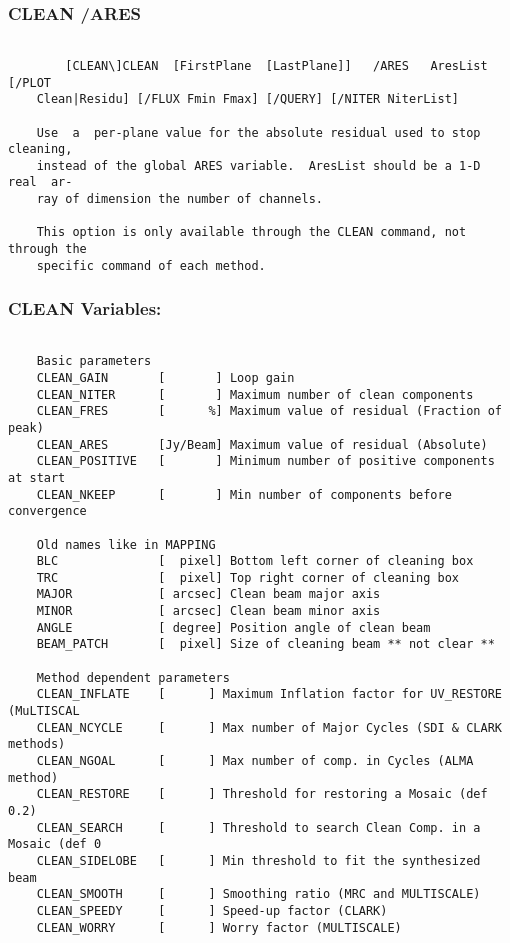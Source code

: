 \subsubsection{CLEAN /ARES}
\begin{verbatim}

        [CLEAN\]CLEAN  [FirstPlane  [LastPlane]]   /ARES   AresList   [/PLOT
    Clean|Residu] [/FLUX Fmin Fmax] [/QUERY] [/NITER NiterList]

    Use  a  per-plane value for the absolute residual used to stop cleaning,
    instead of the global ARES variable.  AresList should be a 1-D real  ar-
    ray of dimension the number of channels.

    This option is only available through the CLEAN command, not through the
    specific command of each method.

\end{verbatim}
\subsubsection{CLEAN Variables:}
\begin{verbatim}

    Basic parameters
    CLEAN_GAIN       [       ] Loop gain
    CLEAN_NITER      [       ] Maximum number of clean components
    CLEAN_FRES       [      %] Maximum value of residual (Fraction of peak)
    CLEAN_ARES       [Jy/Beam] Maximum value of residual (Absolute)
    CLEAN_POSITIVE   [       ] Minimum number of positive components at start
    CLEAN_NKEEP      [       ] Min number of components before convergence

    Old names like in MAPPING
    BLC              [  pixel] Bottom left corner of cleaning box
    TRC              [  pixel] Top right corner of cleaning box
    MAJOR            [ arcsec] Clean beam major axis
    MINOR            [ arcsec] Clean beam minor axis
    ANGLE            [ degree] Position angle of clean beam
    BEAM_PATCH       [  pixel] Size of cleaning beam ** not clear **

    Method dependent parameters
    CLEAN_INFLATE    [      ] Maximum Inflation factor for UV_RESTORE (MuLTISCAL
    CLEAN_NCYCLE     [      ] Max number of Major Cycles (SDI & CLARK methods)
    CLEAN_NGOAL      [      ] Max number of comp. in Cycles (ALMA method)
    CLEAN_RESTORE    [      ] Threshold for restoring a Mosaic (def 0.2)
    CLEAN_SEARCH     [      ] Threshold to search Clean Comp. in a Mosaic (def 0
    CLEAN_SIDELOBE   [      ] Min threshold to fit the synthesized beam
    CLEAN_SMOOTH     [      ] Smoothing ratio (MRC and MULTISCALE)
    CLEAN_SPEEDY     [      ] Speed-up factor (CLARK)
    CLEAN_WORRY      [      ] Worry factor (MULTISCALE)

\end{verbatim}
